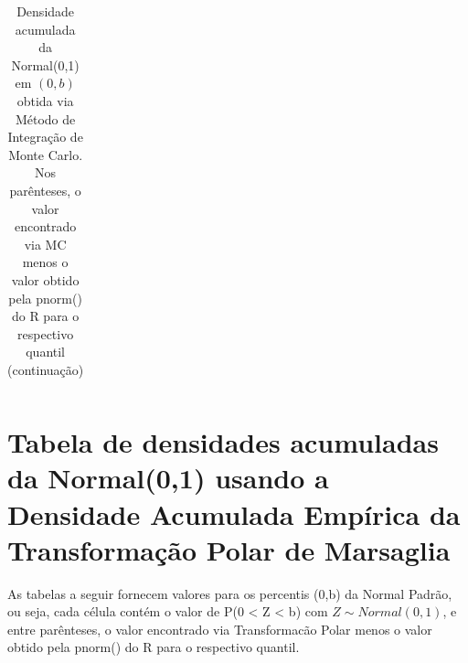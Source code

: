 \documentclass[
	article,			%
	12pt,				%
	twoside,			%
	a4paper,			%
	english,			%
	brazil,				%
	]{abntex2}
\begin{document}
\begin{landscape}
\begin{table}
\begin{tabular}{c||p{18mm}|p{18mm}|p{18mm}|p{18mm}|p{18mm}|p{18mm}|p{18mm}|p{18mm}|p{18mm}|p{18mm}|p{18mm}|p{18mm}|p{18mm}|p{18mm}|p{18mm}|p{18mm}|p{18mm}}
\end{tabular}
\caption{Densidade acumulada da Normal(0,1) em $(0,b)$ obtida via Método de Integração de Monte Carlo. Nos parênteses, o valor encontrado via MC menos o valor obtido pela pnorm() do R para o respectivo quantil (continuação)}
\end{table}

\end{landscape}
    \section{Tabela de densidades acumuladas da Normal(0,1) usando a Densidade Acumulada Empírica da Transformação Polar de Marsaglia}
    
        	As tabelas a seguir fornecem valores para os percentis (0,b) da Normal Padrão, ou seja, cada célula contém o valor de P(0 < Z < b) com $Z \sim Normal(0,1)$, e entre parênteses, o valor encontrado via Transformacão Polar menos o valor obtido pela pnorm() do R para o respectivo quantil.
\end{document}

